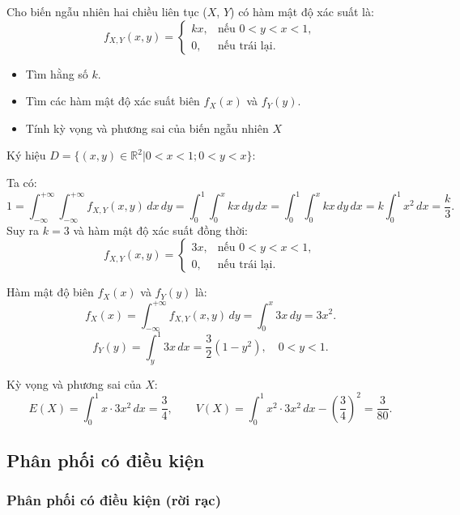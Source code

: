 \documentclass[12pt,a4paper]{article}
\begin{document}
\begin{vidu}
  Cho biến ngẫu nhiên hai chiều liên tục ($X$, $Y$) có hàm mật độ xác suất là:
  \[
    f_{X,Y}(x, y) = \begin{cases}
    kx, & \text{nếu } 0 < y < x < 1, \\
    0, & \text{nếu trái lại}.
  \end{cases}
  \]
  \begin{itemize}
    \item Tìm hằng số $k$.
    \item Tìm các hàm mật độ xác suất biên $f_X(x)$ và $f_Y(y)$.
    \item Tính kỳ vọng và phương sai của biến ngẫu nhiên $X$
  \end{itemize}

  Ký hiệu $D = \{(x, y) \in \mathbb{R}^2 | 0 < x < 1; 0 < y < x\}$:

  Ta có:
  \[
    1 = \displaystyle\int_{-\infty}^{+\infty} \displaystyle\int_{-\infty}^{+\infty} f_{X,Y}(x, y) \, dx \, dy = \displaystyle\int_{0}^{1} \displaystyle\int_{0}^{x} kx \, dy \, dx =
    \displaystyle\int_{0}^{1} \displaystyle\int_{0}^{x} kx \, dy \, dx = k \displaystyle\int_{0}^{1} x^2 \, dx = \dfrac{k}{3}.
  \]
  Suy ra $k = 3$ và hàm mật độ xác suất đồng thời:
  \[
    f_{X,Y}(x, y) = \begin{cases}
    3x, & \text{nếu } 0 < y < x < 1,\\
    0, & \text{nếu trái lại.}
    \end{cases}
  \]

  Hàm mật độ biên $f_X(x)$ và $f_Y(y)$ là:
  \[
    f_X(x) = \displaystyle\int_{-\infty}^{+\infty} f_{X,Y}(x, y) \, dy = \displaystyle\int_{0}^{x} 3x \, dy = 3x^2.
  \]
  \[
    f_Y(y) = \displaystyle\int_{y}^{1} 3x \, dx = \dfrac{3}{2}(1 - y^2), \quad 0 < y < 1.
  \]

  Kỳ vọng và phương sai của $X$:
  \[
    E(X) = \displaystyle\int_{0}^{1} x \cdot 3x^2 \, dx = \dfrac{3}{4}, \qquad
    V(X) = \displaystyle\int_{0}^{1} x^2 \cdot 3x^2 \, dx - \left(\dfrac{3}{4}\right)^2 = \dfrac{3}{80}.
  \]
\end{vidu}

\subsection{Phân phối có điều kiện}

\subsubsection{Phân phối có điều kiện (rời rạc)}
\end{document}
